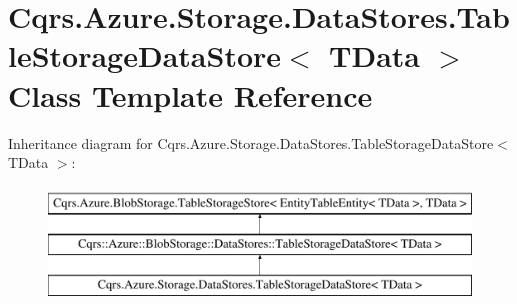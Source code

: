 \hypertarget{classCqrs_1_1Azure_1_1Storage_1_1DataStores_1_1TableStorageDataStore}{}\section{Cqrs.\+Azure.\+Storage.\+Data\+Stores.\+Table\+Storage\+Data\+Store$<$ T\+Data $>$ Class Template Reference}
\label{classCqrs_1_1Azure_1_1Storage_1_1DataStores_1_1TableStorageDataStore}
Inheritance diagram for Cqrs.\+Azure.\+Storage.\+Data\+Stores.\+Table\+Storage\+Data\+Store$<$ T\+Data $>$\+:\begin{figure}[H]
\begin{center}
\leavevmode
\includegraphics[height=3.000000cm]{classCqrs_1_1Azure_1_1Storage_1_1DataStores_1_1TableStorageDataStore}
\end{center}
\end{figure}

